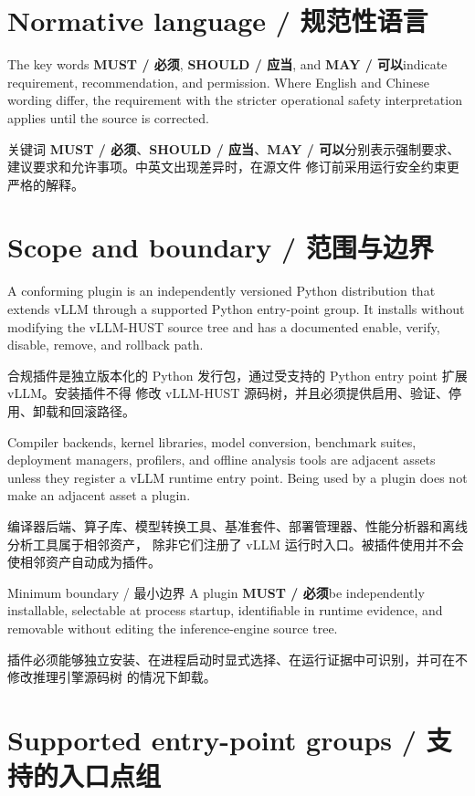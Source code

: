 \documentclass[11pt,a4paper,fontset=none]{ctexart}
\newcommand{\must}{\textbf{MUST / 必须}}
\newcommand{\should}{\textbf{SHOULD / 应当}}
\newcommand{\may}{\textbf{MAY / 可以}}
\begin{document}
\tableofcontents
\newpage

\section{Normative language / 规范性语言}

The key words \must, \should, and \may indicate requirement, recommendation, and permission.
Where English and Chinese wording differ, the requirement with the stricter operational safety
interpretation applies until the source is corrected.

关键词 \must、\should、\may 分别表示强制要求、建议要求和允许事项。中英文出现差异时，在源文件
修订前采用运行安全约束更严格的解释。

\section{Scope and boundary / 范围与边界}

A conforming plugin is an independently versioned Python distribution that extends vLLM through a
supported Python entry-point group. It installs without modifying the vLLM-HUST source tree and has
a documented enable, verify, disable, remove, and rollback path.

合规插件是独立版本化的 Python 发行包，通过受支持的 Python entry point 扩展 vLLM。安装插件不得
修改 vLLM-HUST 源码树，并且必须提供启用、验证、停用、卸载和回滚路径。

Compiler backends, kernel libraries, model conversion, benchmark suites, deployment managers,
profilers, and offline analysis tools are adjacent assets unless they register a vLLM runtime entry
point. Being used by a plugin does not make an adjacent asset a plugin.

编译器后端、算子库、模型转换工具、基准套件、部署管理器、性能分析器和离线分析工具属于相邻资产，
除非它们注册了 vLLM 运行时入口。被插件使用并不会使相邻资产自动成为插件。

\begin{normative}{Minimum boundary / 最小边界}
  A plugin \must be independently installable, selectable at process startup, identifiable in
  runtime evidence, and removable without editing the inference-engine source tree.

  插件必须能够独立安装、在进程启动时显式选择、在运行证据中可识别，并可在不修改推理引擎源码树
  的情况下卸载。
\end{normative}

\section{Supported entry-point groups / 支持的入口点组}
\end{document}
